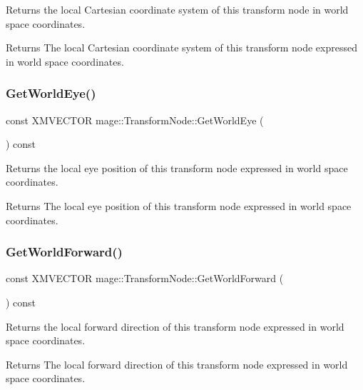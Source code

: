 Returns the local Cartesian coordinate system of this transform node in world space coordinates.

\begin{DoxyReturn}{Returns}
The local Cartesian coordinate system of this transform node expressed in world space coordinates. 
\end{DoxyReturn}
\hypertarget{classmage_1_1_transform_node_abbf6b99c7842fa93eb0ebe881abf4b07}{}\label{classmage_1_1_transform_node_abbf6b99c7842fa93eb0ebe881abf4b07} 
\subsubsection{\texorpdfstring{Get\+World\+Eye()}{GetWorldEye()}}
{\footnotesize\ttfamily const X\+M\+V\+E\+C\+T\+OR mage\+::\+Transform\+Node\+::\+Get\+World\+Eye (\begin{DoxyParamCaption}{ }\end{DoxyParamCaption}) const}

Returns the local eye position of this transform node expressed in world space coordinates.

\begin{DoxyReturn}{Returns}
The local eye position of this transform node expressed in world space coordinates. 
\end{DoxyReturn}
\hypertarget{classmage_1_1_transform_node_a76dbfd8bb65478b3c72e257a67db9791}{}\label{classmage_1_1_transform_node_a76dbfd8bb65478b3c72e257a67db9791} 
\subsubsection{\texorpdfstring{Get\+World\+Forward()}{GetWorldForward()}}
{\footnotesize\ttfamily const X\+M\+V\+E\+C\+T\+OR mage\+::\+Transform\+Node\+::\+Get\+World\+Forward (\begin{DoxyParamCaption}{ }\end{DoxyParamCaption}) const}

Returns the local forward direction of this transform node expressed in world space coordinates.

\begin{DoxyReturn}{Returns}
The local forward direction of this transform node expressed in world space coordinates. 
\end{DoxyReturn}
\hypertarget{classmage_1_1_transform_node_a0a53b7d31fab72be41a6a6d789428d09}{}\label{classmage_1_1_transform_node_a0a53b7d31fab72be41a6a6d789428d09} 
